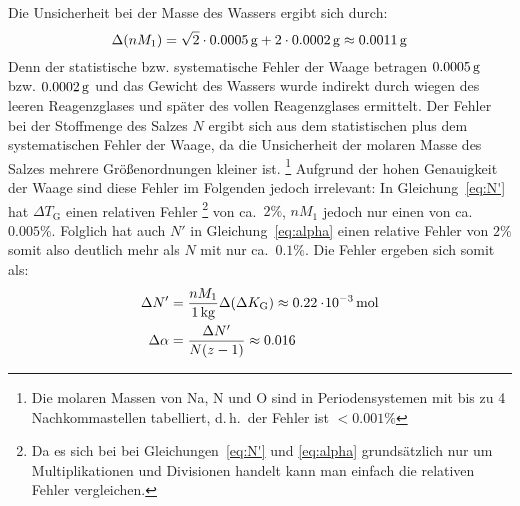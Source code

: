 Die Unsicherheit bei der Masse des Wassers ergibt sich durch:
\[
    \stat(n M_1) = \sqrt{2} \cdot \unit[0.0005]{g} + 2 \cdot \unit[0.0002]{g} \approx \unit[0.0011]{g}
\]
Denn der statistische bzw. systematische Fehler der Waage betragen $\unit[0.0005]{g}$ bzw. $\unit[0.0002]{g}$ und das Gewicht des Wassers wurde indirekt durch wiegen des leeren Reagenzglases und später des vollen Reagenzglases ermittelt.
%
Der Fehler bei der Stoffmenge des Salzes $N$ ergibt sich aus dem statistischen plus dem systematischen Fehler der Waage, da die Unsicherheit der molaren Masse des Salzes mehrere Größenordnungen kleiner ist.%
\footnote{Die molaren Massen von Na, N und O sind in Periodensystemen mit bis zu 4 Nachkommastellen tabelliert, d.\,h.\ der Fehler ist $<0.001\%$}
%
Aufgrund der hohen Genauigkeit der Waage sind diese Fehler im Folgenden jedoch irrelevant: 
%
%
In Gleichung~\ref{eq:N'} hat $\Delta T_\mathrm{G}$ einen relativen Fehler%
\footnote{Da es sich bei bei Gleichungen~\ref{eq:N'} und \ref{eq:alpha} grundsätzlich nur um Multiplikationen und Divisionen handelt kann man einfach die relativen Fehler vergleichen.}
von ca.\ $2\%$, $n M_1$ jedoch nur einen von ca.\ $0.005\%$. Folglich hat auch $N'$ in Gleichung~\ref{eq:alpha} einen relative Fehler von $2\%$ somit also deutlich mehr als $N$ mit nur ca.\ $0.1\%$. Die Fehler ergeben sich somit als:
%
\begin{align*}
        \stat N' &= \frac{n M_1}{\unit[1]{kg}} \stat(\Delta K_\mathrm{G}) \approx \unit[0.22\cdot\! 10^{-3}]{mol} \\
    \stat \alpha &= \frac{\stat N'}{N (z-1)} \approx 0.016
\end{align*}
%






